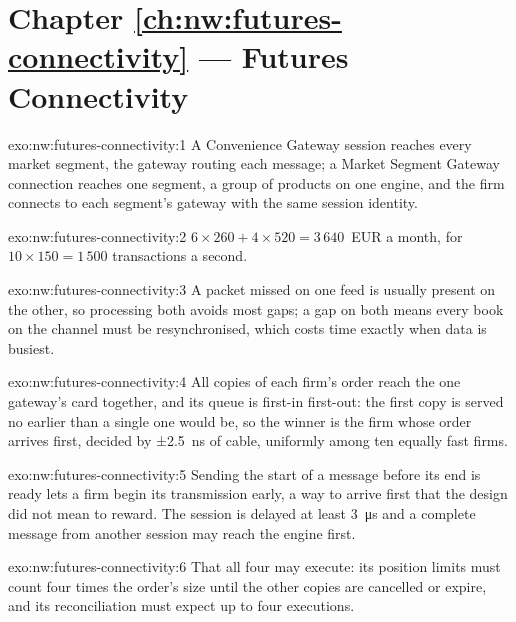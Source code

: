 \section*{Chapter \ref{ch:nw:futures-connectivity} --- Futures Connectivity}

\begin{solution}{exo:nw:futures-connectivity:1}
A Convenience Gateway session reaches every market segment, the gateway routing each message; a Market Segment Gateway connection
reaches one segment, a group of products on one engine, and the firm connects to each segment's gateway with the same session
identity.
\end{solution}

\begin{solution}{exo:nw:futures-connectivity:2}
$6 \times 260 + 4 \times 520 = 3\,640$~EUR a month, for $10 \times 150 = 1\,500$ transactions a second.
\end{solution}

\begin{solution}{exo:nw:futures-connectivity:3}
A packet missed on one feed is usually present on the other, so processing both avoids most gaps; a gap on both means every book on
the channel must be resynchronised, which costs time exactly when data is busiest.
\end{solution}

\begin{solution}{exo:nw:futures-connectivity:4}
All copies of each firm's order reach the one gateway's card together, and its queue is first-in first-out: the first copy is
served no earlier than a single one would be, so the winner is the firm whose order arrives first, decided by ±2.5~ns of cable,
uniformly among ten equally fast firms.
\end{solution}

\begin{solution}{exo:nw:futures-connectivity:5}
Sending the start of a message before its end is ready lets a firm begin its transmission early, a way to arrive first that the
design did not mean to reward. The session is delayed at least \qty{3}{\micro\second} and a complete message from another session
may reach the engine first.
\end{solution}

\begin{solution}{exo:nw:futures-connectivity:6}
That all four may execute: its position limits must count four times the order's size until the other copies are cancelled or
expire, and its reconciliation must expect up to four executions.
\end{solution}

